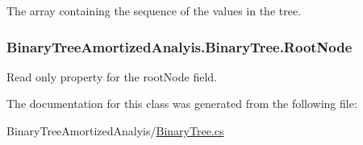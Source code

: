 The array containing the sequence of the values in the tree. 

\subsubsection[{\texorpdfstring{Root\+Node}{RootNode}}]{ Binary\+Tree\+Amortized\+Analyis.\+Binary\+Tree.\+Root\+Node\hspace{0.3cm}{\ttfamily [get]}}\hypertarget{class_binary_tree_amortized_analyis_1_1_binary_tree_a1a88e9a8a44b2c072ed988da7cad43ca}{}\label{class_binary_tree_amortized_analyis_1_1_binary_tree_a1a88e9a8a44b2c072ed988da7cad43ca}


Read only property for the root\+Node field. 



The documentation for this class was generated from the following file\+:\begin{DoxyCompactItemize}
\item 
Binary\+Tree\+Amortized\+Analyis/\hyperlink{_binary_tree_8cs}{Binary\+Tree.\+cs}\end{DoxyCompactItemize}
